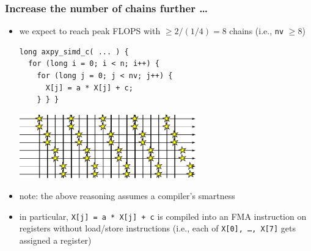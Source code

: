 \documentclass[12pt,dvipdfmx]{beamer}
\begin{document}
\begin{frame}[fragile]
\frametitle{Increase the number of chains further \ldots}
\begin{itemize}
\item we expect to reach peak FLOPS with $\geq 2 / (1/4) = 8$ chains
  (i.e., {\tt nv} $\geq 8$)
\begin{lstlisting}
long axpy_simd_c( ... ) {
  for (long i = 0; i < n; i++) {
    for (long j = 0; j < nv; j++) {
      X[j] = a * X[j] + c;
    } } }
\end{lstlisting}

\begin{center}
\includegraphics[width=0.6\textwidth]{out/pdf/svg/latency_4.pdf}
\end{center}

\item note: the above reasoning assumes a compiler's smartness
\item in particular, 
  {\tt X[j] = a * X[j] + c} is compiled into an FMA instruction
  on registers without load/store instructions
  (i.e., each of {\tt X[0], \ldots, X[7]} gets assigned a register)
\end{itemize}
\end{frame}
\end{document}
